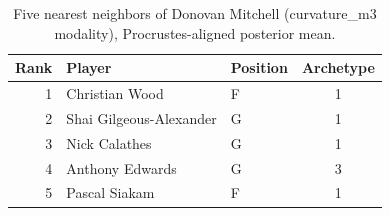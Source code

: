 \begin{table}[htbp]
  \centering\small
  \begin{tabular}{rllc}
    \toprule
    Rank & Player & Position & Archetype \\
    \midrule
    1 & Christian Wood & F & 1 \\
    2 & Shai Gilgeous-Alexander & G & 1 \\
    3 & Nick Calathes & G & 1 \\
    4 & Anthony Edwards & G & 3 \\
    5 & Pascal Siakam & F & 1 \\
    \bottomrule
  \end{tabular}
  \caption{Five nearest neighbors of Donovan Mitchell (curvature_m3 modality), Procrustes-aligned posterior mean.}
  \label{tab:Donovan_Mitchell_neighbors_curvature_m3}
\end{table}

